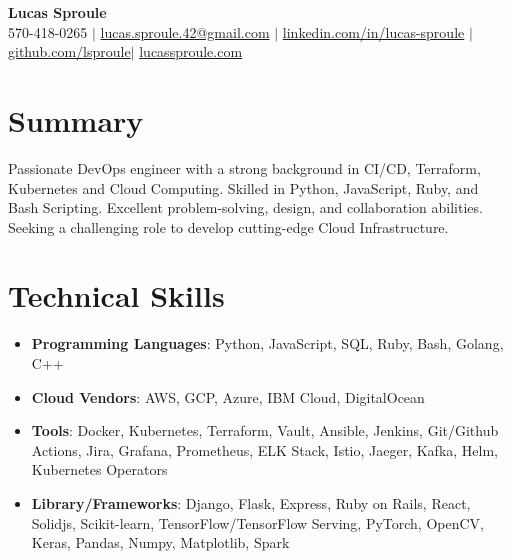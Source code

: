 \documentclass[letterpaper,10pt]{article}
\newcommand{\resumeItem}[1]{\item\small{#1}}
\newcommand{\resumeSubHeadingList}{\begin{itemize}[leftmargin=0.15in, label={}]}
\newcommand{\resumeSubHeadingListEnd}{\end{itemize}}
\begin{document}
\begin{center}
  \textbf{\Huge Lucas Sproule} \\
  \small 570-418-0265 $|$ \href{mailto:lucas.sproule.42@gmail.com}{lucas.sproule.42@gmail.com} $|$ 
  \href{https://linkedin.com/in/lucas-sproule}{linkedin.com/in/lucas-sproule} $|$
  \href{https://github.com/lsproule}{github.com/lsproule}$|$
  \href{https://lucassproule.com}{lucassproule.com}
\end{center}

\section*{Summary}
Passionate DevOps engineer with a strong background in CI/CD, Terraform, Kubernetes and Cloud Computing. Skilled in Python, JavaScript, Ruby, and Bash Scripting. Excellent problem-solving, design, and collaboration abilities. Seeking a challenging role to develop cutting-edge Cloud Infrastructure.

\section{Technical Skills}
\resumeSubHeadingList
  \resumeItem{\textbf{Programming Languages}: Python, JavaScript, SQL, Ruby, Bash, Golang, C++}
  \resumeItem{\textbf{Cloud Vendors}: AWS, GCP, Azure, IBM Cloud, DigitalOcean}
  \resumeItem{\textbf{Tools}: Docker, Kubernetes, Terraform, Vault,  Ansible, Jenkins, Git/Github Actions, Jira, Grafana, Prometheus, ELK Stack, Istio, Jaeger, Kafka, Helm, Kubernetes Operators}
  \resumeItem{\textbf{Library/Frameworks}: Django, Flask, Express, Ruby on Rails, React, Solidjs, Scikit-learn, TensorFlow/TensorFlow Serving, PyTorch, OpenCV, Keras, Pandas, Numpy, Matplotlib, Spark}
\resumeSubHeadingListEnd
\end{document}
